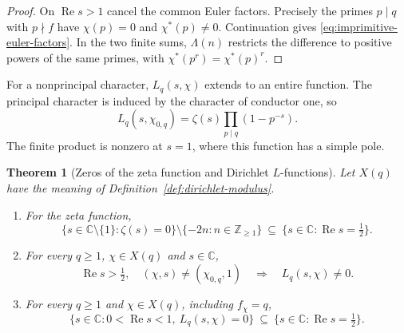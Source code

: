 \documentclass[11pt]{article}
\newtheorem{theorem}{Theorem}[section]
\theoremstyle{definition}
\theoremstyle{plain}
\newcommand{\C}{\mathbb C}
\newcommand{\RePart}{\operatorname{Re}}
\newenvironment{construction}{\par\addvspace{.7\baselineskip}\noindent
  \begin{minipage}{\linewidth}\captionsetup{type=figure}\centering\small
  \renewcommand{\arraystretch}{1.16}%
  \setlength{\abovedisplayskip}{4pt}\setlength{\belowdisplayskip}{4pt}}
  {\end{minipage}\par\addvspace{.7\baselineskip}}
\begin{document}
\begin{proof}
On \(\RePart s>1\) cancel the common Euler factors. Precisely the primes
\(p\mid q\) with \(p\nmid f\) have \(\chi(p)=0\) and
\(\chi^*(p)\ne0\). Continuation gives \eqref{eq:imprimitive-euler-factors}.
In the two finite sums, \(\Lambda(n)\) restricts the difference to positive
powers of the same primes, with \(\chi^*(p^r)=\chi^*(p)^r\).
\end{proof}

For a nonprincipal character, \(L_q(s,\chi)\) extends to an entire function.
The principal character is induced by the character of conductor one, so
\[
 L_q(s,\chi_{0,q})=\zeta(s)\prod_{p\mid q}(1-p^{-s}).
\]
The finite product is nonzero at \(s=1\), where this function has a simple pole.

\begin{theorem}[Zeros of the zeta function and Dirichlet \(L\)-functions]\label{thm:claims}
Let \(X(q)\) have the meaning of Definition~\ref{def:dirichlet-modulus}.
\begin{enumerate}
\item For the zeta function,
\[
 \{s\in\C\setminus\{1\}:\zeta(s)=0\}\setminus
       \{-2n:n\in\mathbb Z_{\ge1}\}
       \ \subseteq\ \{s\in\C:\RePart s=\tfrac12\}.
\]
\item For every \(q\ge1\), \(\chi\in X(q)\) and \(s\in\C\),
\[
 \RePart s>\tfrac12,\quad (\chi,s)\ne(\chi_{0,q},1)
       \quad\Longrightarrow\quad L_q(s,\chi)\ne0 .
\]
\item For every \(q\ge1\) and \(\chi\in X(q)\), including \(f_\chi=q\),
\[
 \{s\in\C:0<\RePart s<1,\ L_q(s,\chi)=0\}
       \ \subseteq\ \{s\in\C:\RePart s=\tfrac12\}.
\]
\end{enumerate}
\end{theorem}

\begin{construction}
\caption{The domains in Theorem~\ref{thm:claims}. Shading marks the open critical strip. The circle marks the exception at \(s=1\) for the principal character.}\label{fig:zero-domains}
\end{construction}
\end{document}
